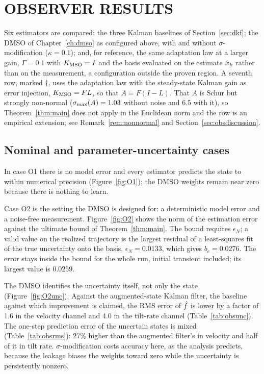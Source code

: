 \section{OBSERVER RESULTS}

Six estimators are compared: the three Kalman baselines of
Section~\ref{sec:dkf}; the DMSO of Chapter~\ref{ch:dmso} as configured above,
with and without $\sigma$-modification ($\kappa=0.1$); and, for reference, the
same adaptation law at a larger gain, $\Gamma=0.1$ with $K_{\mathrm{MSO}}=I$ and the basis
evaluated on the estimate $\hat{x}_k$ rather than on the measurement, a
configuration outside the proven region. A seventh row, marked $\dagger$, uses
the adaptation law with the steady-state Kalman gain as error injection,
$K_{\mathrm{MSO}}=FL$, so that $A=F(I-L)$. That $A$ is Schur but strongly non-normal
($\sigma_{\max}(A)=1.03$ without noise and $6.5$ with it), so Theorem~\ref{thm:main}
does not apply in the Euclidean norm and the row is an empirical extension;
see Remark~\ref{rem:nonnormal} and Section~\ref{sec:obsdiscussion}.

\subsection{Nominal and parameter-uncertainty cases}

In case O1 there is no model error and every estimator predicts the state
to within numerical precision (Figure~\ref{fig:O1}); the DMSO weights remain
near zero because there is nothing to learn.

Case O2 is the setting the DMSO is designed for: a deterministic model error and
a noise-free measurement. Figure~\ref{fig:O2} shows the norm of the estimation
error against the ultimate bound of Theorem~\ref{thm:main}. The bound requires
$\epsilon_N$; a valid value on the realized trajectory is the largest residual
of a least-squares fit of the true uncertainty onto the basis,
$\epsilon_N=0.0133$, which gives $b_e=0.0276$. The error stays inside the bound
for the whole run, initial transient included; its largest value is $0.0259$.

The DMSO identifies the uncertainty itself, not only the state
(Figure~\ref{fig:O2unc}). Against the augmented-state Kalman filter, the
baseline against which improvement is claimed, the RMS error of $\hat{f}$ is
lower by a factor of 1.6 in the velocity channel and 4.0 in the tilt-rate
channel (Table~\ref{tab:obsunc}). The one-step prediction error of the
uncertain states is mixed (Table~\ref{tab:obsrms}): 27\% higher than the
augmented filter's in velocity and half of it in tilt rate.
$\sigma$-modification costs accuracy here, as the analysis predicts, because
the leakage biases the weights toward zero while the uncertainty is
persistently nonzero.


